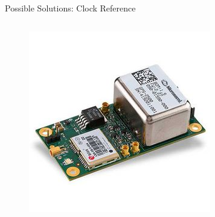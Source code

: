 \begin{frame}{Possible Solutions: Clock Reference}
\begin{columns}[t]
\begin{column}[t]{0.4\textwidth}
            \begin{figure}[!ht]
                \begin{center}
                    \includegraphics[width=0.8\columnwidth]{figures/gps-2550}
                \end{center}
            \end{figure}
        \end{column}
    \end{columns}

\end{frame}

